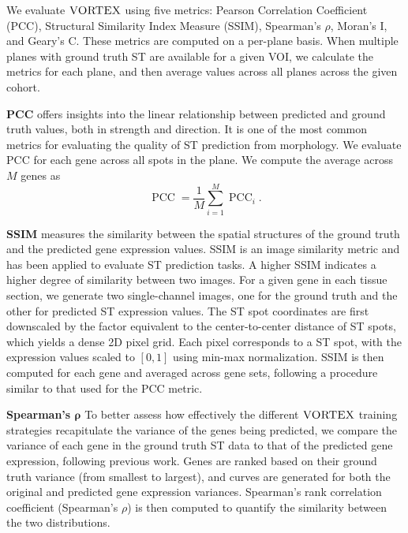 
We evaluate $\textsc{VORTEX}$ using five metrics: Pearson Correlation Coefficient (PCC), Structural Similarity Index Measure (SSIM), Spearman's $\rho$, Moran's I, and Geary's C. These metrics are computed on a per-plane basis. When multiple planes with ground truth ST are available for a given VOI, we calculate the metrics for each plane, and then average values across all planes across the given cohort.

\noindent\textbf{PCC} offers insights into the linear relationship
between predicted and ground truth values, both in strength
and direction. It is one of the most common metrics for evaluating the quality of ST prediction from morphology\cite{zhang2024inferring,he2020integrating,chung2024accurate,wang2025benchmark}. We evaluate PCC for each gene across all spots in the plane. We compute the average across $M$ genes as
\begin{equation}
\operatorname{PCC} = \frac{1}{M} \sum_{i=1}^{M} \operatorname{PCC}_i.
\end{equation}

\noindent\textbf{SSIM} measures the similarity between the spatial structures of the ground truth and the predicted gene expression values. SSIM is an image similarity metric and has been applied to evaluate ST prediction tasks\cite{zhang2024inferring,wang2025benchmark}. A higher SSIM
indicates a higher degree of similarity between two images. For a given gene in each tissue section, we generate two single-channel images, one for the ground truth and the other for predicted ST expression values. The ST spot coordinates are first downscaled by the factor equivalent to the center-to-center distance of ST spots, which yields a dense 2D pixel grid. Each pixel corresponds to a ST spot, with the expression values scaled to $[0,1]$ using min-max normalization. 
SSIM is then computed for each gene and averaged across gene sets, following a procedure similar to that used for the PCC metric.

\noindent\textbf{Spearman's $\mathbf{\rho}$} To better assess how effectively the different $\textsc{VORTEX}$ training strategies recapitulate the variance of the genes being predicted, we compare the variance of each gene in the ground truth ST data to that of the predicted gene expression, following previous work\cite{xie2024spatially}.
Genes are ranked based on their ground truth variance (from smallest to largest), and curves are generated for both the original and predicted gene expression variances. Spearman's rank correlation coefficient (Spearman's $\rho$) is then computed to quantify the similarity between the two distributions.


